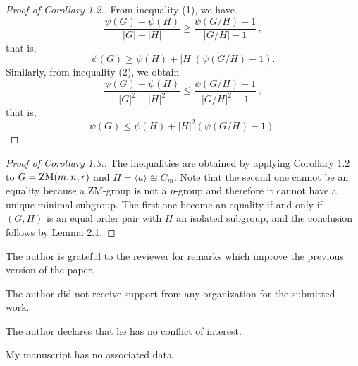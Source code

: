 \documentclass[12pt]{article}
\newcommand{\0}{{\leqno}}
\begin{document}
\begin{proof}[Proof of Corollary 1.2.] 
From inequality (1), we have
\begin{equation}
\frac{\psi(G)-\psi(H)}{|G|-|H|}\geq\frac{\psi(G/H)-1}{|G/H|-1}\,,\nonumber
\end{equation}that is,
\begin{equation}
\psi(G)\geq\psi(H)+|H|(\psi(G/H)-1).\nonumber
\end{equation}Similarly, from inequality (2), we obtain
\begin{equation}
\frac{\psi(G)-\psi(H)}{|G|^2-|H|^2}\leq\frac{\psi(G/H)-1}{|G/H|^2-1}\,,\nonumber
\end{equation}that is,
\begin{equation}
\psi(G)\leq\psi(H)+|H|^2(\psi(G/H)-1).\nonumber
\end{equation}
\end{proof}

\begin{proof}[Proof of Corollary 1.3.] 
The inequalities are obtained by applying Corollary 1.2 to $G={\rm ZM}(m,n,r)$ and $H=\langle a\rangle\cong C_m$. Note that the second one cannot be an equality because a ZM-group is not a $p$-group and therefore it cannot have a unique minimal subgroup. The first one become an equality if and only if $(G,H)$ is an equal order pair with $H$ an isolated subgroup, and the conclusion follows by Lemma 2.1. 
\end{proof}

\bigskip{} The author is grateful to the reviewer for remarks which improve the previous version of the paper.
\bigskip

\bigskip{} The author did not receive support from any organization for the submitted work.

\bigskip{} The author declares that he has no conflict of interest.

\bigskip{} My manuscript has no associated data.
\end{document}
